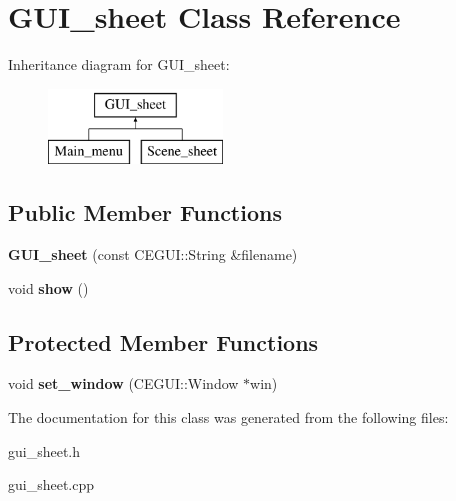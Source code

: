 \hypertarget{class_g_u_i__sheet}{
\section{GUI\_\-sheet Class Reference}
\label{class_g_u_i__sheet}
}
Inheritance diagram for GUI\_\-sheet:\begin{figure}[H]
\begin{center}
\leavevmode
\includegraphics[height=2.000000cm]{class_g_u_i__sheet}
\end{center}
\end{figure}
\subsection*{Public Member Functions}
\begin{DoxyCompactItemize}
\item 
\hypertarget{class_g_u_i__sheet_a09f59e188932529f521ad748fb7d2254}{
{\bfseries GUI\_\-sheet} (const CEGUI::String \&filename)}
\label{class_g_u_i__sheet_a09f59e188932529f521ad748fb7d2254}

\item 
\hypertarget{class_g_u_i__sheet_a41c95b25bd0541addba513e769dac125}{
void {\bfseries show} ()}
\label{class_g_u_i__sheet_a41c95b25bd0541addba513e769dac125}

\end{DoxyCompactItemize}
\subsection*{Protected Member Functions}
\begin{DoxyCompactItemize}
\item 
\hypertarget{class_g_u_i__sheet_af6e0f1386b24f7b88eac40a80534a91f}{
void {\bfseries set\_\-window} (CEGUI::Window $\ast$win)}
\label{class_g_u_i__sheet_af6e0f1386b24f7b88eac40a80534a91f}

\end{DoxyCompactItemize}


The documentation for this class was generated from the following files:\begin{DoxyCompactItemize}
\item 
gui\_\-sheet.h\item 
gui\_\-sheet.cpp\end{DoxyCompactItemize}
